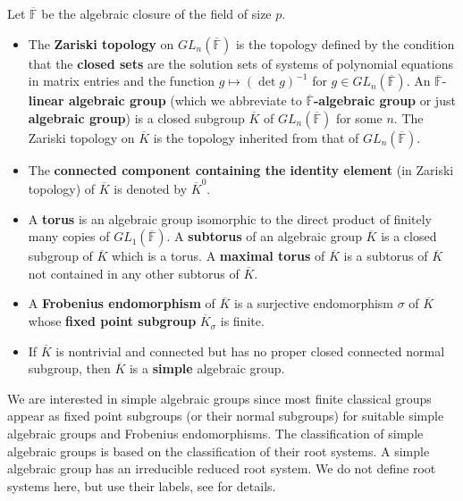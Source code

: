 \begin{Def}
Let $\overline{\mathbb{F}}$ be the algebraic closure of the field of size $p.$
\begin{itemize}
\item     The {\bf Zariski topology} on $GL_n(\overline{\mathbb{F}})$ is the topology defined by the condition that the {\bf closed sets} are the solution sets of systems of polynomial equations in matrix entries and the function $g \mapsto (\det g)^{-1}$ for $g \in GL_n(\overline{\mathbb{F}}).$ An $\overline{\mathbb{F}}$-{\bf linear algebraic group} (which we abbreviate to $\overline{\mathbb{F}}${\bf -algebraic group} or just { \bf algebraic group}) is a closed subgroup $\overline{K}$ of  $GL_n(\overline{\mathbb{F}})$ for some $n.$ The Zariski topology on $\overline{K}$ is the topology inherited from that of $GL_n(\overline{\mathbb{F}})$.
\item The {\bf connected component containing the identity element}  (in Zariski topology) of $\overline{K}$ is denoted by $\overline{K}^0.$
\item A {\bf torus}  is an algebraic group  isomorphic to the direct product of finitely many copies of $GL_1(\overline{\mathbb{F}}).$ A {\bf subtorus} of an algebraic group $\overline{K}$ is a closed subgroup of $\overline{K}$ which
is a torus. A {\bf maximal torus}  of $\overline{K}$ is a subtorus of $\overline{K}$ not contained in any other
subtorus of $\overline{K}$.
\item A {\bf Frobenius endomorphism}  of  $\overline{K}$ is a surjective endomorphism $\sigma$ of $\overline{K}$
whose {\bf fixed point subgroup} $\overline{K}_{\sigma}$ is finite.
\item If $\overline{K}$ is nontrivial and connected but has no proper closed connected normal subgroup, then $\overline{K}$ is a {\bf simple} algebraic group. 
\end{itemize}
\end{Def}

We are interested in simple algebraic groups since most  finite classical groups appear as fixed point subgroups (or their normal subgroups) for suitable simple algebraic groups and Frobenius endomorphisms. The classification of simple algebraic groups is based on the classification of their root systems. A simple algebraic group has an irreducible reduced root system. We do not define root systems here, but use their labels, see \cite[Chapter 1]{carter} for details. 



